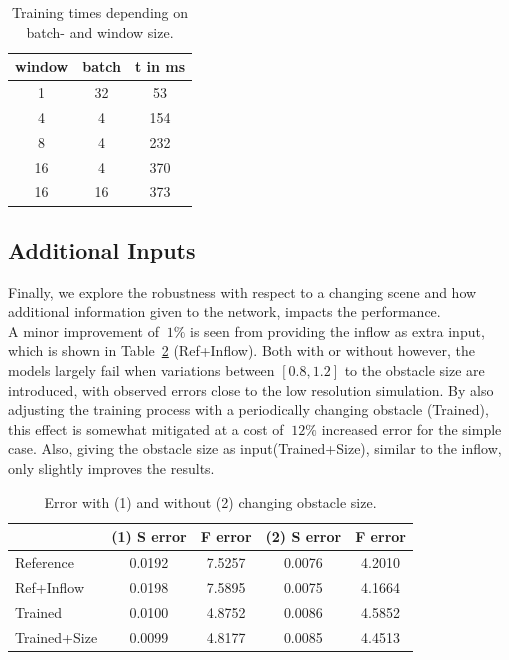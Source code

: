 \documentclass[sigconf]{acmart}
\begin{document}
\begin{table}
	\centering
	\caption{Training times depending on batch- and window size.}
	\label{tab:bwsize}
	\begin{tabular}{ccc}
		\hline
		window  & batch  & t in ms \\ \hline
		1  & 32 &   53    \\
		4  & 4  &   154   \\
		8  & 4  &   232   \\
		16 & 4  &   370   \\
		16 & 16 &   373   \\ \hline
	\end{tabular}
\end{table}
\subsection{Additional Inputs}
Finally, we explore the robustness with respect to a changing scene and how additional information given to the network, impacts the performance. \\ 
A minor improvement of $~1\%$ is seen from providing the inflow as extra input, which is shown in Table~\ref{tab:errobs} (Ref+Inflow).
Both with or without however, the models largely fail when variations between $[0.8,1.2]$ to the obstacle size are introduced, with observed errors close to the low resolution simulation.
By also adjusting the training process with a periodically changing obstacle (Trained), this effect is somewhat mitigated at a cost of $~12\%$ increased error for the simple case.
Also, giving the obstacle size as input(Trained+Size), similar to the inflow, only slightly improves the results.

\begin{table}
	\centering
	\caption{Error with (1) and without (2) changing obstacle size.}
	\label{tab:errobs}
	\begin{tabular}{lcccc}
		\hline
		              & (1) S error & F error & (2) S error & F error \\ \hline
		Reference     &   0.0192    & 7.5257  &   0.0076    & 4.2010  \\
		Ref+Inflow    &   0.0198    & 7.5895  &   0.0075    & 4.1664  \\
		Trained       &   0.0100    & 4.8752  &   0.0086    & 4.5852  \\
		Trained+Size  &   0.0099    & 4.8177  &   0.0085    & 4.4513  \\ \hline
	\end{tabular}
\end{table}
\end{document}
